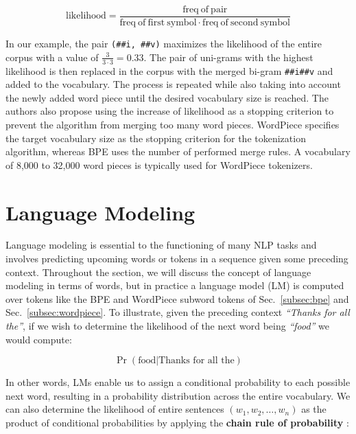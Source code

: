 \begin{equation}
    \mathrm{likelihood} = \frac{\mathrm{freq\ of\ pair}}{\mathrm{freq\ of\ first\ symbol} 
    \cdot \mathrm{freq\ of\ second\ symbol}}
\end{equation}

In our example, the pair \texttt{(\#\#i, \#\#v)} maximizes the likelihood of the
entire corpus with a value of $\frac{3}{3 \cdot 3} = 0.33$. The pair of
uni-grams with the highest likelihood is then replaced in the corpus with the
merged bi-gram \texttt{\#\#i\#\#v} and added to the vocabulary. The process is
repeated while also taking into account the newly added word piece until the
desired vocabulary size is reached. The authors also propose using the increase
of likelihood as a stopping criterion to prevent the algorithm from merging too
many word pieces. WordPiece specifies the target vocabulary size as the stopping
criterion for the tokenization algorithm, whereas BPE uses the number of
performed merge rules. A vocabulary of 8,000 to 32,000 word pieces is typically
used for WordPiece tokenizers.

\section{Language Modeling} \label{sec:lm}

Language modeling is essential to the functioning of many NLP tasks and involves
predicting upcoming words or tokens in a sequence given some preceding context.
Throughout the section, we will discuss the concept of language modeling in
terms of words, but in practice a language model (LM) is computed over tokens
like the BPE and WordPiece subword tokens of Sec.~\ref{subsec:bpe} and
Sec.~\ref{subsec:wordpiece}. To illustrate, given the preceding context
\textit{``Thanks for all the''}, if we wish to determine the likelihood of the
next word being \textit{``food''} we would compute:

\begin{equation*}
    \Pr(\text{food} | \text{Thanks for all the})
\end{equation*}

In other words, LMs enable us to assign a conditional probability to each
possible next word, resulting in a probability distribution across the entire
vocabulary. We can also determine the likelihood of entire sentences $(w_1, w_2,
\ldots, w_n)$ as the product of conditional probabilities by applying the
\textbf{chain rule of probability} \cite{eisenstein2019intro2nlp}:

